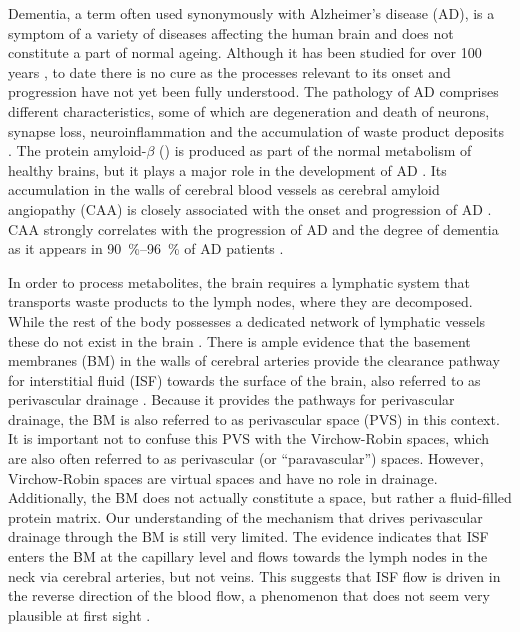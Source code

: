\documentclass[a4paper,titlepage]{scrartcl}
\begin{document}


Dementia, a term often used synonymously with Alzheimer's disease (AD), is a symptom of a variety of diseases affecting the human brain and does not constitute a part of normal ageing. Although it has been studied for over 100 years \cite{Selkoe2001}, to date there is no cure as the processes relevant to its onset and progression have not yet been fully understood. The pathology of AD comprises different characteristics, some of which are degeneration and death of neurons, synapse loss, neuroinflammation and the accumulation of waste product deposits \cite{Koffie2011}. The protein amyloid-$\beta$ (\Ab) is produced as part of the normal metabolism of healthy brains, but it plays a major role in the development of AD \cite{Haass1992}. Its accumulation in the walls of cerebral blood vessels as cerebral amyloid angiopathy (CAA) is closely associated with the onset and progression of AD \cite{Weller2006, Weller2009}. CAA strongly correlates with the progression of AD and the degree of dementia as it appears in \SIrange{90}{96}{\percent} of AD patients \cite{Weller2009a}.

In order to process metabolites, the brain requires a lymphatic system that transports waste products to the lymph nodes, where they are decomposed. While the rest of the body possesses a dedicated network of lymphatic vessels these do not exist in the brain \cite{Weller2010}. There is ample evidence that the basement membranes (BM) in the walls of cerebral arteries provide the clearance pathway for interstitial fluid (ISF) towards the surface of the brain, also referred to as perivascular drainage \cite{Weller2010,Carare2008,Hawkes2011,Morris2014}. Because it provides the pathways for perivascular drainage, the BM is also referred to as perivascular space (PVS) in this context. It is important not to confuse this PVS with the Virchow-Robin spaces, which are also often referred to as perivascular (or ``paravascular'') spaces. However, Virchow-Robin spaces are virtual spaces and have no role in \Ab drainage. Additionally, the BM does not actually constitute a space, but rather a fluid-filled protein matrix. Our understanding of the mechanism that drives perivascular drainage through the BM is still very limited. The evidence indicates that ISF enters the BM at the capillary level and flows towards the lymph nodes in the neck via cerebral arteries, but not veins. This suggests that ISF flow is driven in the reverse direction of the blood flow, a phenomenon that does not seem very plausible at first sight \cite{Carare2008}.
\end{document}
